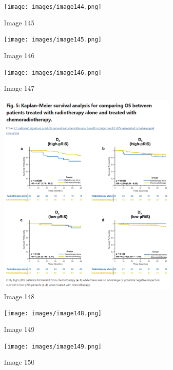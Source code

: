 \documentclass{article}%
\begin{document}
%


\begin{figure}[h!]%
\centering%
\texttt{[image: images/image144.png]}%
\caption{Image 145}%
\end{figure}

%


\begin{figure}[h!]%
\centering%
\texttt{[image: images/image145.png]}%
\caption{Image 146}%
\end{figure}

%


\begin{figure}[h!]%
\centering%
\texttt{[image: images/image146.png]}%
\caption{Image 147}%
\end{figure}

%


\begin{figure}[h!]%
\centering%
\includegraphics[width=0.8\textwidth]{images/image147.png}%
\caption{Image 148}%
\end{figure}

%


\begin{figure}[h!]%
\centering%
\texttt{[image: images/image148.png]}%
\caption{Image 149}%
\end{figure}

%


\begin{figure}[h!]%
\centering%
\texttt{[image: images/image149.png]}%
\caption{Image 150}%
\end{figure}
\end{document}
